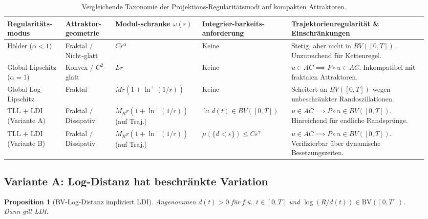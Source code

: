 \documentclass[12pt,a4paper]{article}
\theoremstyle{definition}
\theoremstyle{plain}
\newtheorem{proposition}[definition]{Proposition}
\theoremstyle{remark}
\newcommand{\BV}{\mathrm{BV}}
\begin{document}
\begin{table}[htbp]
\centering
\caption{Vergleichende Taxonomie der Projektions-Regularitätsmodi auf kompakten Attraktoren.}
\label{tab:regularity_taxonomy}
\vspace{0.2cm}
\footnotesize
\begin{tabularx}{\textwidth}{>{\raggedright\arraybackslash}p{2.3cm} >{\raggedright\arraybackslash}p{2.2cm} >{\raggedright\arraybackslash}p{2.2cm} >{\raggedright\arraybackslash}p{2.5cm} X}
\toprule
\textbf{Regularitäts-modus} & \textbf{Attraktor-geometrie} & \textbf{Modul-schranke $\omega(r)$} & \textbf{Integrier-barkeits-anforderung} & \textbf{Trajektorienregularität \& Einschränkungen} \\
\midrule
Hölder ($\alpha < 1$) & Fraktal / Nicht-glatt & $C r^\alpha$ & Keine & Stetig, aber nicht in $BV([0,T])$. Unzureichend für Kettenregel. \\
Global Lipschitz ($\alpha=1$) & Konvex / $C^2$-glatt & $L r$ & Keine & $u \in AC \implies P \circ u \in AC$. Inkompatibel mit fraktalen Attraktoren. \\
Global Log-Lipschitz & Fraktal & $M r (1 + \ln^+(1/r))$ & Keine & Scheitert an $BV([0,T])$ wegen unbeschränkter Randoszillationen. \\
TLL + LDI (Variante A) & Fraktal / Dissipativ & $M_R r (1 + \ln^+(1/r))$ (auf Traj.) & $\ln d(t) \in BV([0,T])$ & $u \in AC \implies P \circ u \in BV([0,T])$. Hinreichend für endliche Randsprünge. \\
TLL + LDI (Variante B) & Fraktal / Dissipativ & $M_R r (1 + \ln^+(1/r))$ (auf Traj.) & $\mu(\{d < \varepsilon\}) \le C \varepsilon^\gamma$ & $u \in AC \implies P \circ u \in BV([0,T])$. Verifizierbar über dynamische Besetzungszeiten. \\
\bottomrule
\end{tabularx}
\end{table}

\subsection{Variante A: Log-Distanz hat beschränkte Variation}

\begin{proposition}[BV-Log-Distanz impliziert LDI]
\label{prop:variant-A}
Angenommen $d(t) > 0$ für f.ü.\ $t \in [0,T]$ und
$\log(R/d(t)) \in \BV([0,T])$.  Dann gilt LDI.
\end{proposition}
\end{document}
